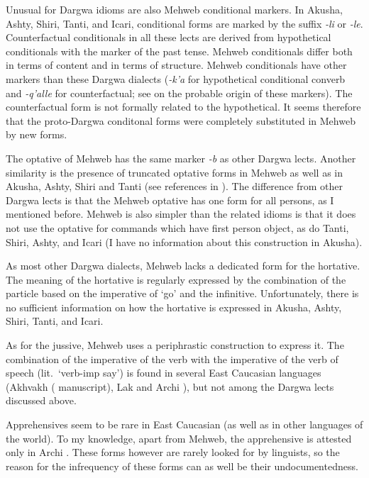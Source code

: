 ﻿\documentclass[output=paper]{langsci/langscibook}
\begin{document}
Unusual for Dargwa idioms are also Mehweb conditional markers. In
Akusha, Ashty, Shiri, Tanti, and Icari, conditional forms are marked by
the suffix \emph{-li} or \emph{-le}. Counterfactual conditionals in
all these lects are derived from hypothetical conditionals with the
marker of the past tense. Mehweb conditionals differ both in terms of
content and in terms of structure. Mehweb conditionals have other
markers than these Dargwa dialects (\emph{-k'a} for hypothetical
conditional converb and \emph{-q'alle} for counterfactual; see
 on the probable origin of these markers). The counterfactual form is
not formally related to the hypothetical. It seems therefore that the
proto-Dargwa conditonal forms were completely substituted in Mehweb by
new forms.


The optative of Mehweb has the same marker \emph{-b} as other Dargwa
lects. Another similarity is the presence of truncated optative forms in
Mehweb as well as in Akusha, Ashty, Shiri and Tanti (see references in ).
The difference from other Dargwa lects is that the Mehweb optative
has one form for all persons, as I mentioned before.
Mehweb is also
simpler than the related idioms is that it does not
use the optative for commands which have first person object, as do
Tanti, Shiri, Ashty, and Icari (I have no information about this
construction in Akusha).
{\par}

As most other Dargwa dialects, Mehweb lacks a dedicated form for the
hortative. The meaning of the hortative is regularly expressed by the
combination of the particle based on the imperative of `go' and the
infinitive. Unfortunately, there is no sufficient information on how the
hortative is expressed in Akusha, Ashty, Shiri, Tanti, and Icari.

As for the jussive, Mehweb uses a periphrastic construction to express
it. The combination of the imperative of the verb with the imperative of
the verb of speech (lit.~`verb-imp say') is found in several East
Caucasian languages (Akhvakh (\citeauthor{creissels:optative} manuscript), Lak and Archi
\citep{dobrushina2012}), but not among the Dargwa lects discussed above.

Apprehensives seem to be rare in East Caucasian (as well as in other
languages of the world). To my knowledge, apart from Mehweb, the
apprehensive is attested only in Archi \citep{kibrik1977}. These forms
however are rarely looked for by linguists, so the reason for the
infrequency of these forms can as well be their undocumentedness.
\end{document}
